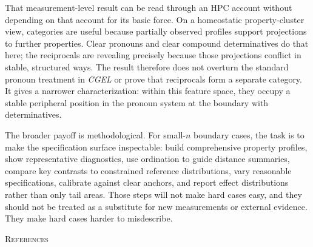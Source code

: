 \documentclass[12pt]{article}
\begin{document}
That measurement-level result can be read through an HPC account without depending on that account for its basic force. On a homeostatic property-cluster view, categories are useful because partially observed profiles support projections to further properties. Clear pronouns and clear compound determinatives do that here; the reciprocals are revealing precisely because those projections conflict in stable, structured ways. The result therefore does not overturn the standard pronoun treatment in \textit{CGEL} or prove that reciprocals form a separate category. It gives a narrower characterization: within this feature space, they occupy a stable peripheral position in the pronoun system at the boundary with determinatives.

The broader payoff is methodological. For small-$n$ boundary cases, the task is to make the specification surface inspectable: build comprehensive property profiles, show representative diagnostics, use ordination to guide distance summaries, compare key contrasts to constrained reference distributions, vary reasonable specifications, calibrate against clear anchors, and report effect distributions rather than only tail areas. Those steps will not make hard cases easy, and they should not be treated as a substitute for new measurements or external evidence. They make hard cases harder to misdescribe.


\clearpage
{\centering\textsc{References}}

\begin{sloppypar}
\printbibliography[heading=none]
\end{sloppypar}
\end{document}
